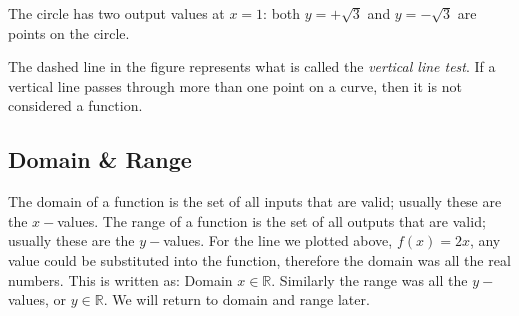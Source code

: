 The circle has two output values at $x=1$: both $y=+\sqrt{3}$ and $y=-\sqrt{3}$ are points on the circle.
\begin{center}
\end{center}
The dashed line in the figure represents what is called the \textit{vertical line test}. If a vertical line passes through more than one point on a curve, then it is not considered a function.

\subsection*{Domain \& Range}
The domain of a function is the set of all inputs that are valid; usually these are the $x-$values. The range of a function is the set of all outputs that are valid; usually these are the $y-$values. For the line we plotted above, $f(x)=2x$, any value could be substituted into the function, therefore the domain was all the real numbers. This is written as: Domain $x \in \mathbb{R}$. Similarly the range was all the $y-$values, or  $y \in \mathbb{R}$. We will return to domain and range later.

